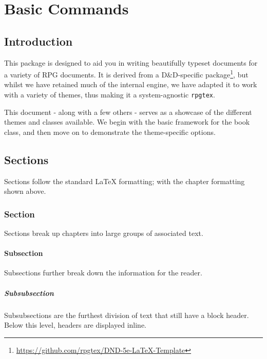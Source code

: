 
\frontmatter
{}
\maketitle

\tableofcontents


\mainmatter{}

\part[engine_part]{Basic Commands}

	\chapter{Introduction}


	 This package is designed to aid you in writing beautifully typeset documents for a variety of RPG documents. It is derived from {a D\&D-specific package}\footnote{\url{https://github.com/rpgtex/DND-5e-LaTeX-Template}}, but whilst we have retained much of the internal engine, we have adapted it to work with a variety of themes, thus making it a system-agnostic \verb|rpgtex|.

	This document - along with a few others - serves as a showcase of the different themes and classes available. We begin with the basic framework for the book class, and then move on to demonstrate the theme-specific options.

	\chapter{Sections}
		Sections follow the standard \LaTeX{} formatting; with the chapter formatting shown above.
		\section{Section}
			Sections break up chapters into large groups of associated text.

			\subsection{Subsection}
				Subsections further break down the information for the reader.

				\subsubsection{Subsubsection}
					Subsubsections are the furthest division of text that still have a block header. Below this level, headers are displayed inline.

